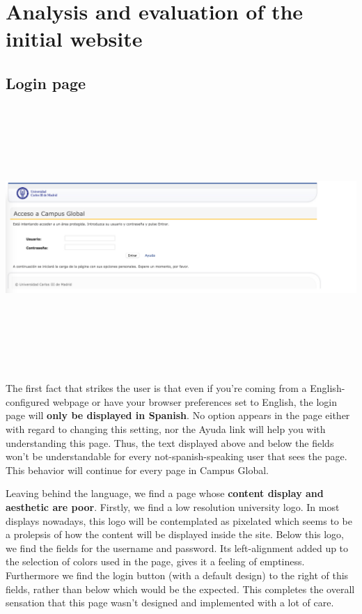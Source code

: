 \documentclass{article}
\begin{document}
\section{Analysis	and	evaluation	of	the	initial website}
\subsection{Login page}

\includegraphics[width=15cm, height=10cm, keepaspectratio]{loginpage} 


The first fact that strikes the user is that even if you’re coming from a English-configured webpage or have your browser preferences set to English, the login page will \textbf{only be displayed in Spanish}. No option appears in the page either with regard to changing this setting, nor the Ayuda link will help you with understanding this page. Thus, the text displayed above and below the fields won’t be understandable for every not-spanish-speaking user that sees the page. This behavior will continue for every page in Campus Global.


Leaving behind the language, we find a page whose \textbf{content display and aesthetic are poor}.
Firstly, we find a low resolution university logo. In most displays nowadays, this logo will be contemplated as pixelated which seems to be a prolepsis of how the content will be displayed inside the site. 
Below this logo, we find the fields for the username and password. Its left-alignment added up to the selection of colors used in the page, gives it a feeling of emptiness. Furthermore we find the login button (with a default design) to the right of this fields, rather than below which would be the expected. This completes the overall sensation that this page wasn't designed and implemented with a lot of care.
\end{document}
